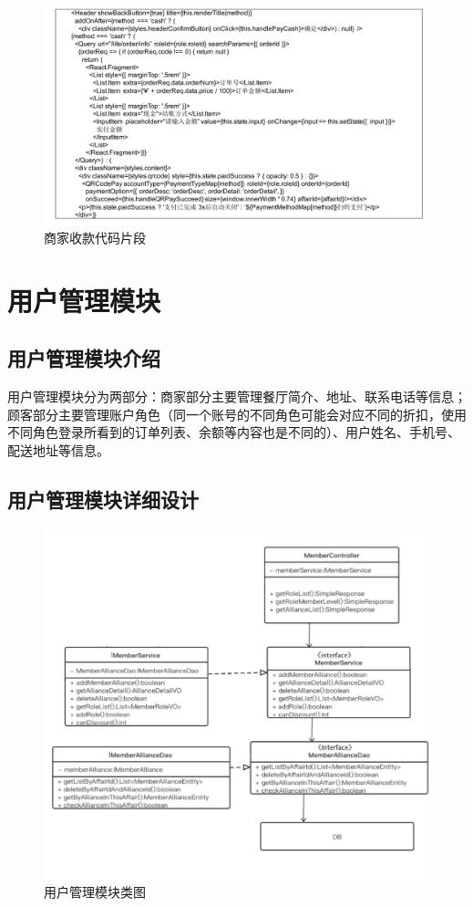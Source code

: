 \begin{figure}[htbp!]
    \centering
    \includegraphics[width=\linewidth]{FIGs/chapter4/3.pdf}
    \caption{商家收款代码片段}\label{fig_pay_3}
\end{figure}

\section{用户管理模块}
\subsection{用户管理模块介绍}
用户管理模块分为两部分：商家部分主要管理餐厅简介、地址、联系电话等信息；顾客部分主要管理账户角色（同一个账号的不同角色可能会对应不同的折扣，使用不同角色登录所看到的订单列表、余额等内容也是不同的）、用户姓名、手机号、配送地址等信息。\\

\subsection{用户管理模块详细设计}
\begin{figure}[htbp!]
    \centering
    \includegraphics[width=\linewidth]{FIGs/chapter4/user.pdf}
    \caption{用户管理模块类图}\label{fig_user}
\end{figure}

